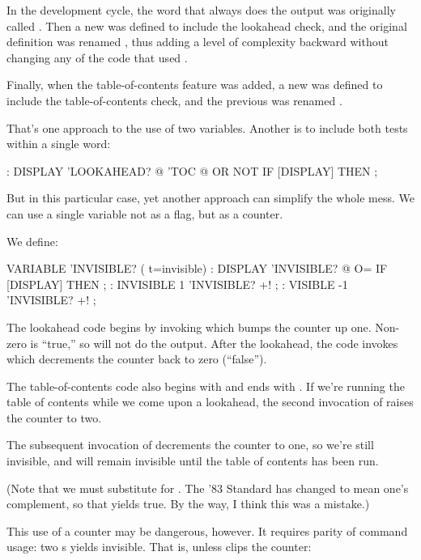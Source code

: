In the development cycle, the word \forth{[DISPLAY]} that always does
the output was originally called . Then a new
 was defined to include the lookahead check, and the
original definition was renamed \forth{[DISPLAY]}, thus adding a level
of complexity backward without changing any of the code that used
.

Finally, when the table-of-contents feature was added, a new
 was defined to include the table-of-contents check,
and the previous  was renamed .

That's one approach to the use of two variables. Another is to include
both tests within a single word:

\begin{Code}
: DISPLAY   'LOOKAHEAD? @  'TOC @ OR  NOT IF [DISPLAY] THEN ;
\end{Code}
But in this particular case, yet another approach can simplify the whole
mess. We can use a single variable not as a flag, but as a counter.

We define:

\begin{Code}
VARIABLE 'INVISIBLE?  ( t=invisible)
: DISPLAY   'INVISIBLE? @  O= IF [DISPLAY] THEN ;
: INVISIBLE   1 'INVISIBLE? +! ;
: VISIBLE    -1 'INVISIBLE? +! ;
\end{Code}
The lookahead code begins by invoking  which bumps
the counter up one. Non-zero is ``true,'' so  will not
do the output.  After the lookahead, the code invokes 
which decrements the counter back to zero (``false'').

The table-of-contents code also begins with  and ends
with . If we're running the table of contents while
we come upon a lookahead, the second invocation of 
raises the counter to two.

The subsequent invocation of  decrements the counter
to one, so we're still invisible, and will remain invisible until the
table of contents has been run.

(Note that we must substitute  for . The '83
Standard has changed  to mean one's complement, so that
 yields true. By the way, I think this was a mistake.)

This use of a counter may be dangerous, however. It requires parity of
command usage: two s yields invisible. That is, unless
 clips the counter:


